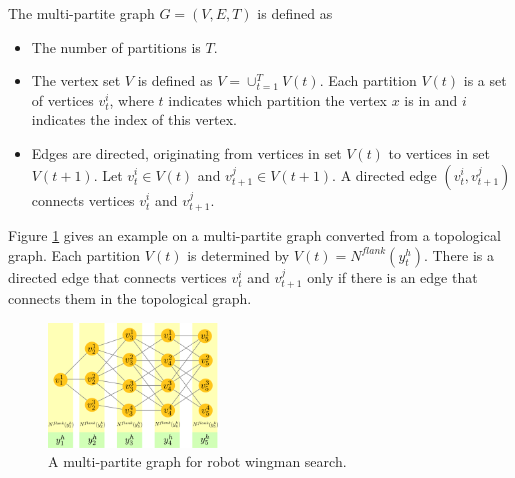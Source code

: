 \begin{mydef}
\label{def:multi_partite}
The multi-partite graph $ G = (V, E, T) $ is defined as
\begin{itemize}
\item The number of partitions is $ T $.
\item The vertex set $ V $ is defined as $ V = \cup_{t=1}^{T} V(t) $.
Each partition $ V(t) $ is a set of vertices $ v^{i}_{t} $, where $ t $ indicates which partition the vertex $ x $ is in and $ i $ indicates the index of this vertex.
\item Edges are directed, originating from vertices in set $ V(t) $ to vertices in set $ V(t+1) $.
Let $ v^{i}_{t} \in V(t) $ and $ v^{j}_{t+1} \in V(t+1) $.
A directed edge $ (v^{i}_{t}, v^{j}_{t+1}) $ connects vertices $ v^{i}_{t} $ and $ v^{j}_{t+1} $. 
\end{itemize}
\end{mydef}

Figure \ref{fig:MultiPartite} gives an example on a multi-partite graph converted from a topological graph.
Each partition $ V(t) $ is determined by $ V(t) = N^{flank} ( y^{h}_{t} ) $.
There is a directed edge that connects vertices $ v^{i}_{t} $ and $ v^{j}_{t+1} $ only if there is an edge that connects them in the topological graph.

\begin{figure}[htbp]
\centering
\includegraphics[width=0.4\textwidth]{./images/MultiPartite.pdf}
\caption{A multi-partite graph for robot wingman search.}
\label{fig:MultiPartite}
\end{figure}
 
